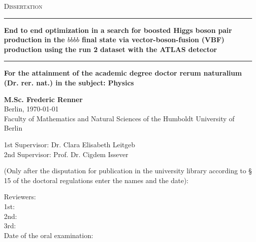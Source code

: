 
\begin{titlepage}
    \begin{center}
	{\scshape\Large Dissertation\\}
	\vspace{.1cm}
	\rule[1pt]{\textwidth}{1.5pt}
    \LARGE{\textbf{End to end optimization in a search for boosted Higgs boson pair production in the $bbbb$ final state via vector-boson-fusion (VBF) production using the run 2 dataset with the ATLAS detector}}
    \rule[11pt]{\textwidth}{1.5pt}
	
    {\normalsize\textbf{For the attainment of the academic degree doctor rerum naturalium (Dr. rer. nat.) in the subject: Physics}} 
    \vspace{1cm}

    \Large{\textbf{M.Sc. Frederic Renner\\}}
	Berlin, \today\\
    \vspace{1cm}
    \large
	Faculty of Mathematics and Natural Sciences of the Humboldt University of Berlin\\
    \vspace{1cm}

	1st Supervisor: Dr. Clara Elisabeth Leitgeb\\
	2nd Supervisor: Prof. Dr. Cigdem Issever
	\vspace{01cm}


	\newpage 
	(Only after the disputation for publication in the university library according to § 15	of the doctoral regulations enter the names and the date):\\
	\raggedright
	Reviewers: \\
	1st: \\
	2nd: \\
	3rd: \\
	
	Date of the oral examination: 
\end{center}
\end{titlepage}
